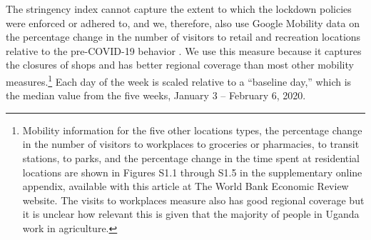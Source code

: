 \documentclass{wber}
\begin{document}
The stringency index cannot capture the extent to which the lockdown
policies were enforced or adhered to, and we, therefore, also use Google
Mobility data on the percentage change in the number of visitors to
retail and recreation locations relative to the pre-COVID-19 behavior
\citep{Google2022}. We use this measure because it captures the closures
of shops and has better regional coverage than most other mobility
measures.\footnote{Mobility information for the five other locations
  types, the percentage change in the number of visitors to workplaces
  to groceries or pharmacies, to transit stations, to parks, and the
  percentage change in the time spent at residential locations are shown
  in Figures S1.1 through S1.5  in the supplementary online appendix, available 
  with this article at The World Bank Economic Review website.
  The visits to workplaces measure also has good regional coverage but it is unclear
  how relevant this is given that the majority of people in Uganda work
  in agriculture.} Each day of the week is scaled relative to a
``baseline day,'' which is the median value from the five weeks, January
3 -- February 6, 2020.
\end{document}
